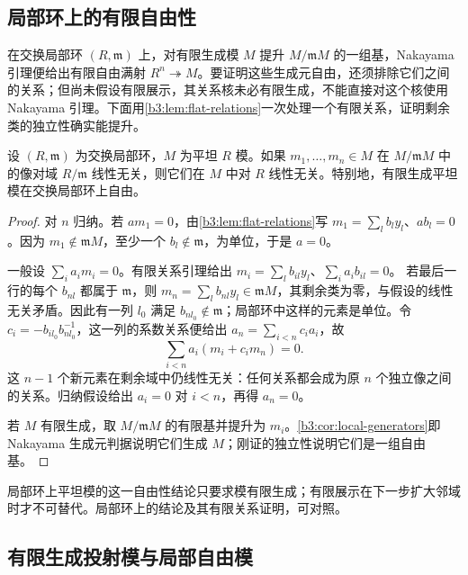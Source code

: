 \subsection{局部环上的有限自由性}\label{b3:subsec:1202:02}

在交换局部环 \((R,\mathfrak m)\) 上，对有限生成模 \(M\) 提升 \(M/\mathfrak mM\) 的一组基，Nakayama 引理便给出有限自由满射 \(R^n\twoheadrightarrow M\)。要证明这些生成元自由，还须排除它们之间的关系；但尚未假设有限展示，其关系核未必有限生成，不能直接对这个核使用 Nakayama 引理。下面用\cref{b3:lem:flat-relations}一次处理一个有限关系，证明剩余类的独立性确实能提升。

\begin{lemma}\label{b3:lem:finite-flat-local-free}
	设 \((R,\mathfrak m)\) 为交换局部环，\(M\) 为平坦 \(R\) 模。如果 \(m_1,\ldots,m_n\in M\) 在 \(M/\mathfrak mM\) 中的像对域 \(R/\mathfrak m\) 线性无关，则它们在 \(M\) 中对 \(R\) 线性无关。特别地，有限生成平坦模在交换局部环上自由。
\end{lemma}
\begin{proof}
	对 \(n\) 归纳。若 \(am_1=0\)，由\cref{b3:lem:flat-relations}写 \(m_1=\sum_l b_l y_l\)、\(ab_l=0\)。因为 \(m_1\notin\mathfrak mM\)，至少一个 \(b_l\notin\mathfrak m\)，为单位，于是 \(a=0\)。

	一般设 \(\sum_i a_im_i=0\)。有限关系引理给出 \(m_i=\sum_l b_{il}y_l\)、\(\sum_i a_i b_{il}=0\)。 若最后一行的每个 \(b_{nl}\) 都属于 \(\mathfrak m\)，则 \(m_n=\sum_l b_{nl}y_l\in\mathfrak mM\)，其剩余类为零，与假设的线性无关矛盾。因此有一列 \(l_0\) 满足 \(b_{nl_0}\notin\mathfrak m\)；局部环中这样的元素是单位。令 \(c_i=-b_{il_0}b_{nl_0}^{-1}\)，这一列的系数关系便给出 \(a_n=\sum_{i<n}c_i a_i\)，故
	\[
		\sum_{i<n}a_i(m_i+c_i m_n)=0.
	\]
	这 \(n-1\) 个新元素在剩余域中仍线性无关：任何关系都会成为原 \(n\) 个独立像之间的关系。归纳假设给出 \(a_i=0\) 对 \(i<n\)，再得 \(a_n=0\)。

	若 \(M\) 有限生成，取 \(M/\mathfrak mM\) 的有限基并提升为 \(m_i\)。\cref{b3:cor:local-generators}即 Nakayama 生成元判据说明它们生成 \(M\)；刚证的独立性说明它们是一组自由基。
\end{proof}

局部环上平坦模的这一自由性结论只要求模有限生成；有限展示在下一步扩大邻域时才不可替代。局部环上的结论及其有限关系证明，可对照\cite[\S7, Theorem 7.10, pp. 51--52]{Matsumura1989CommutativeRingTheory}。

\subsection{有限生成投射模与局部自由模}\label{b3:subsec:1202:03}

